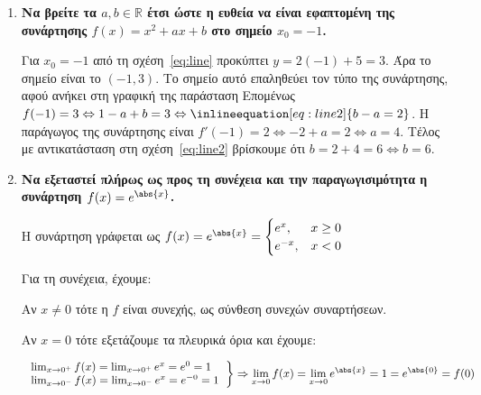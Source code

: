 



\everymath{\displaystyle}



\begin{center}
\end{center}

\vspace{\baselineskip}

\begin{enumerate}
	\item {\bfseries \boldmath Να βρείτε τα $ a, b \in \mathbb{R} $ έτσι ώστε η ευθεία
		να είναι εφαπτομένη της συνάρτησης $ f(x) = x^{2} + ax + b $ στο
	σημείο $ x_{0} = -1 $.} 


		Για $ x_{0} = -1 $ από τη σχέση~\eqref{eq:line}  προκύπτει $ y = 2(-1) + 5 =
		3$. Άρα το σημείο είναι το $ (-1,3) $. Το σημείο αυτό επαληθεύει τον
		τύπο της συνάρτησης, αφού ανήκει στη γραφική της παράσταση
		Επομένως $ f(-1) = 3 \Leftrightarrow 1 - a + b = 3
		\Leftrightarrow \inlineequation[eq:line2]{b - a = 2} $. 
		Η παράγωγος της συνάρτησης είναι $ f'(-1) = 2 \Leftrightarrow -2 + a = 2
		\Leftrightarrow a = 4$. Τέλος με αντικατάσταση στη
		σχέση~\eqref{eq:line2} βρίσκουμε ότι $ b = 2 + 4 = 6 \Leftrightarrow b=6
		$.


	\item {\bfseries \boldmath Να εξεταστεί πλήρως ως προς τη συνέχεια και την παραγωγισιμότητα η
		συνάρτηση $ f(x) = e^{\abs{x}} $.}


		Η συνάρτηση γράφεται ως $ f(x) = e^{\abs{x}} = \begin{cases}
				e^{x}, & x\geq 0 \\
				e^{-x}, & x < 0 
			\end{cases}$	
		
		Για τη συνέχεια, έχουμε:

		Αν $ x\neq 0 $ τότε η $f$ είναι συνεχής, ως σύνθεση συνεχών συναρτήσεων.

		Αν $ x = 0 $ τότε εξετάζουμε τα πλευρικά όρια και έχουμε:

		\[
		\left.
		\begin{tabular}{l}
			$\lim_{x\to 0^{+}} f(x) = \lim_{x\to 0^{+}} e^{x} =  e^{0} = 1$ \\ 
			$\lim_{x\to 0^{-}} f(x) = \lim_{x\to 0^{-}} e^{x} = e^{-0} = 1$
		\end{tabular}
		\right\}
		\Rightarrow \lim_{x\to 0} f(x) = \lim_{x\to 0} e^{\abs{x}} = 1 = e^{\abs{0}} = f(0) 
		\]


\end{enumerate}
